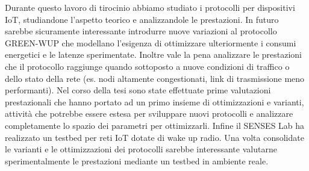 \documentclass[binding=0.6cm,TFA]{sapthesis}
\begin{document}
Durante questo lavoro di tirocinio abbiamo studiato i protocolli per dispositivi IoT, studiandone l'aspetto teorico e analizzandole le prestazioni. In futuro
sarebbe sicuramente interessante introdurre nuove variazioni al protocollo GREEN-WUP che modellano l'esigenza di ottimizzare ulteriormente i consumi energetici
e le latenze sperimentate. Inoltre vale la pena analizzare le prestazioni che il protocollo raggiunge quando sottoposto a nuove condizioni di traffico o dello
stato della rete (es. nodi altamente congestionati, link di trasmissione meno performanti). Nel corso della tesi sono state effettuate prime valutazioni prestazionali
che hanno portato ad un primo insieme di ottimizzazioni e varianti, attività che potrebbe essere estesa per sviluppare nuovi protocolli e analizzare completamente
lo spazio dei parametri per ottimizzarli. Infine il SENSES Lab ha realizzato un testbed per reti IoT dotate di wake up radio. Una volta consolidate le varianti e
le ottimizzazioni dei protocolli sarebbe interessante valutarne sperimentalmente le prestazioni mediante un testbed in ambiente reale.


\backmatter
\cleardoublepage
{} %
\end{document}
